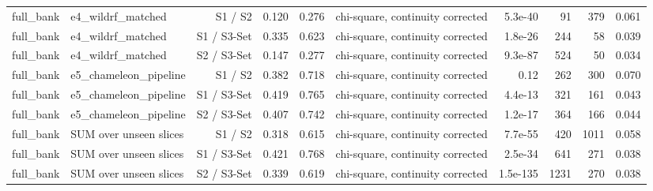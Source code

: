 \begin{table}[htbp]
\begin{tabular}{llrrrrrrrr}
full\_bank & e4\_wildrf\_matched & S1 / S2 & 0.120 & 0.276 & chi-square, continuity corrected & 5.3e-40 & 91 & 379 & 0.061 \\
full\_bank & e4\_wildrf\_matched & S1 / S3-Set & 0.335 & 0.623 & chi-square, continuity corrected & 1.8e-26 & 244 & 58 & 0.039 \\
full\_bank & e4\_wildrf\_matched & S2 / S3-Set & 0.147 & 0.277 & chi-square, continuity corrected & 9.3e-87 & 524 & 50 & 0.034 \\
full\_bank & e5\_chameleon\_pipeline & S1 / S2 & 0.382 & 0.718 & chi-square, continuity corrected & 0.12 & 262 & 300 & 0.070 \\
full\_bank & e5\_chameleon\_pipeline & S1 / S3-Set & 0.419 & 0.765 & chi-square, continuity corrected & 4.4e-13 & 321 & 161 & 0.043 \\
full\_bank & e5\_chameleon\_pipeline & S2 / S3-Set & 0.407 & 0.742 & chi-square, continuity corrected & 1.2e-17 & 364 & 166 & 0.044 \\
full\_bank & SUM over unseen slices & S1 / S2 & 0.318 & 0.615 & chi-square, continuity corrected & 7.7e-55 & 420 & 1011 & 0.058 \\
full\_bank & SUM over unseen slices & S1 / S3-Set & 0.421 & 0.768 & chi-square, continuity corrected & 2.5e-34 & 641 & 271 & 0.038 \\
full\_bank & SUM over unseen slices & S2 / S3-Set & 0.339 & 0.619 & chi-square, continuity corrected & 1.5e-135 & 1231 & 270 & 0.038 \\
\bottomrule
\end{tabular}
\end{table}
